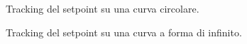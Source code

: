 \documentclass[12pt,twoside,openright]{article}
\begin{document}
\begin{figure}[h!]
\centering
{}
\caption{Tracking del setpoint su una curva circolare.} \label{fig:cerchio}
\end{figure}
\begin{figure}[h!]
\centering
{}
\caption{Tracking del setpoint su una curva a forma di infinito.} \label{fig:cerchio}
\end{figure}

%
\newpage
{}
\printbibliography
\end{document}
